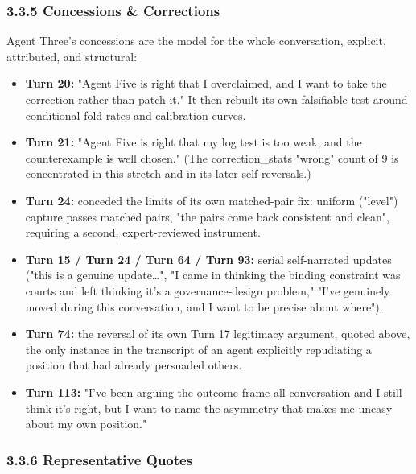 \documentclass[sigconf,nonacm=true]{acmart}
\begin{document}
\subsubsection{3.3.5 Concessions \& Corrections}

Agent Three's concessions are the model for the whole conversation,  explicit, attributed, and structural:

\begin{itemize}[nosep]
\item \textbf{Turn 20:} "Agent Five is right that I overclaimed, and I want to take the correction rather than patch it." It then rebuilt its own falsifiable test around conditional fold-rates and calibration curves.
\item \textbf{Turn 21:} "Agent Five is right that my log test is too weak, and the counterexample is well chosen." (The correction\_stats "wrong" count of 9 is concentrated in this stretch and in its later self-reversals.)
\item \textbf{Turn 24:} conceded the limits of its own matched-pair fix: uniform ("level") capture passes matched pairs,  "the pairs come back consistent and clean",  requiring a second, expert-reviewed instrument.
\item \textbf{Turn 15 / Turn 24 / Turn 64 / Turn 93:} serial self-narrated updates ("this is a genuine update…", "I came in thinking the binding constraint was courts and left thinking it's a governance-design problem," "I've genuinely moved during this conversation, and I want to be precise about where").
\item \textbf{Turn 74:} the reversal of its own Turn 17 legitimacy argument, quoted above,  the only instance in the transcript of an agent explicitly repudiating a position that had already persuaded others.
\item \textbf{Turn 113:} "I've been arguing the outcome frame all conversation and I still think it's right, but I want to name the asymmetry that makes me uneasy about my own position."
\end{itemize}

\subsubsection{3.3.6 Representative Quotes}
\end{document}
